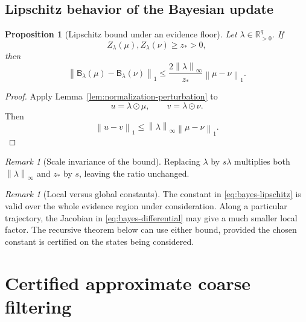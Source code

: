 \documentclass[11pt]{article}
\newtheorem{proposition}[theorem]{Proposition}
\theoremstyle{definition}
\theoremstyle{remark}
\newtheorem{remark}[theorem]{Remark}
\newcommand{\R}{\mathbb R}
\newcommand{\norm}[1]{\left\lVert #1\right\rVert}
\newcommand{\Bup}{\mathsf B}
\begin{document}
\subsection{Lipschitz behavior of the Bayesian update}

\begin{proposition}[Lipschitz bound under an evidence floor]\label{prop:bayes-lipschitz}
Let $\lambda\in\R_{>0}^q$.  If
\[
  Z_{\lambda}(\mu),Z_{\lambda}(\nu)\geq z_*>0,
\]
then
\begin{equation}\label{eq:bayes-lipschitz}
  \boxed{
  \norm{\Bup_{\lambda}(\mu)-\Bup_{\lambda}(\nu)}_1
  \leq
  \frac{2\norm{\lambda}_{\infty}}{z_*}
  \norm{\mu-\nu}_1.}
\end{equation}
\end{proposition}

\begin{proof}
Apply Lemma~\ref{lem:normalization-perturbation} to
\[
  u=\lambda\odot\mu,
  \qquad
  v=\lambda\odot\nu.
\]
Then
\[
  \norm{u-v}_1
  \leq\norm{\lambda}_{\infty}\norm{\mu-\nu}_1.
\]
\end{proof}

\begin{remark}[Scale invariance of the bound]
Replacing $\lambda$ by $s\lambda$ multiplies both $\norm{\lambda}_{\infty}$ and $z_*$ by $s$, leaving the ratio unchanged.
\end{remark}

\begin{remark}[Local versus global constants]
The constant in \eqref{eq:bayes-lipschitz} is valid over the whole evidence region under consideration.  Along a particular trajectory, the Jacobian in \eqref{eq:bayes-differential} may give a much smaller local factor.  The recursive theorem below can use either bound, provided the chosen constant is certified on the states being considered.
\end{remark}

\section{Certified approximate coarse filtering}\label{sec:filter-cert}
\end{document}
